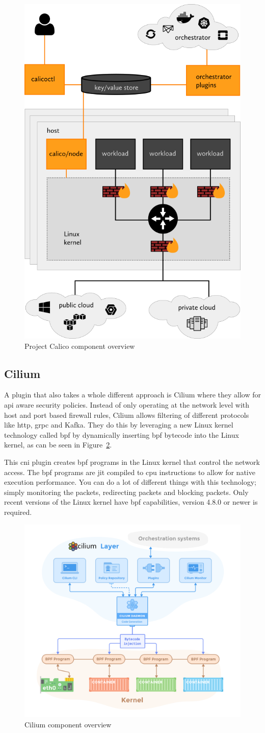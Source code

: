 \begin{figure}
    \centering
    \includegraphics[width=0.4\columnwidth]{images/calico-arch}
    \caption{Project Calico component overview \cite{calico_about}}
    \label{fig:calico-arc}
\end{figure}

\subsection{Cilium}
A plugin that also takes a whole different approach is Cilium\cite{cilium} where they allow for \gls{api} aware security policies. Instead of only operating at the network level with host and port based firewall rules, Cilium allows filtering of different protocols like \gls{http}, \gls{grpc}\cite{grpc} and Kafka\cite{kafka}. They do this by leveraging a new Linux kernel technology called \gls{bpf}\cite{mccanne1993bsd, cilium_bpf} by dynamically inserting \gls{bpf} bytecode into the Linux kernel, as can be seen in Figure~\ref{fig:cilium-arch}. 

This \gls{cni} plugin creates \gls{bpf} programs in the Linux kernel that control the network access. The \gls{bpf} programs are \gls{jit} compiled to \gls{cpu} instructions to allow for native execution performance. You can do a lot of different things with this technology; simply monitoring the packets, redirecting packets and blocking packets. Only recent versions of the Linux kernel have \gls{bpf} capabilities, version 4.8.0 or newer is required. 

\begin{figure}
    \centering
    \includegraphics[width=0.7\columnwidth]{images/cilium-arch}
    \caption{Cilium component overview \cite{cilium_concepts}}
    \label{fig:cilium-arch}
\end{figure}
